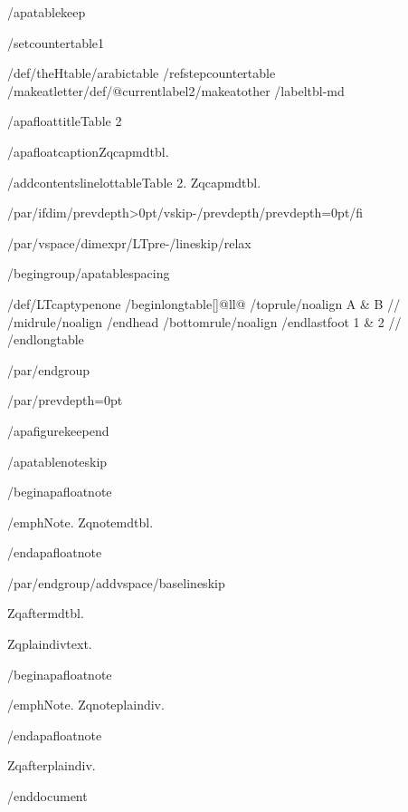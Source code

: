 /apatablekeep

/setcounter{table}{1}

/def/theHtable{/arabic{table}}%
/refstepcounter{table}%
/makeatletter/def/@currentlabel{2}/makeatother%
/label{tbl-md}

/apafloattitle{Table 2}

/apafloatcaption{Zqcapmdtbl.}

/addcontentsline{lot}{table}{Table 2. Zqcapmdtbl.}

/par/ifdim/prevdepth>0pt/vskip-/prevdepth/prevdepth=0pt/fi

/par/vspace{/dimexpr/LTpre-/lineskip/relax}

/begingroup/apatablespacing

{/def/LTcaptype{none} %
/begin{longtable}[]{@{}ll@{}}
/toprule/noalign{}
A & B //
/midrule/noalign{}
/endhead
/bottomrule/noalign{}
/endlastfoot
1 & 2 //
/end{longtable}
}

/par/endgroup

/par/prevdepth=0pt

/apafigurekeepend

/apatablenoteskip

/begin{apafloatnote}

/emph{Note}. Zqnotemdtbl.

/end{apafloatnote}

/par/endgroup/addvspace{/baselineskip}

Zqaftermdtbl.

Zqplaindivtext.

/begin{apafloatnote}

/emph{Note}. Zqnoteplaindiv.

/end{apafloatnote}

Zqafterplaindiv.




/end{document}
